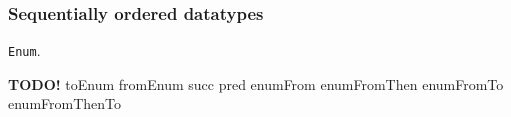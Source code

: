 %

\subsubsection{Sequentially ordered datatypes}
\texttt{Enum}.

\textbf{TODO!}
toEnum fromEnum succ pred enumFrom enumFromThen enumFromTo enumFromThenTo

%